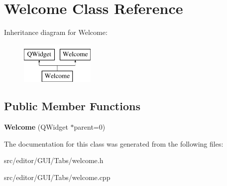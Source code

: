 \hypertarget{class_welcome}{}\section{Welcome Class Reference}
\label{class_welcome}
Inheritance diagram for Welcome\+:\begin{figure}[H]
\begin{center}
\leavevmode
\includegraphics[height=2.000000cm]{class_welcome}
\end{center}
\end{figure}
\subsection*{Public Member Functions}
\begin{DoxyCompactItemize}
\item 
\hypertarget{class_welcome_acf62624f1107ddc68761d25febbf10ad}{}\label{class_welcome_acf62624f1107ddc68761d25febbf10ad} 
{\bfseries Welcome} (Q\+Widget $\ast$parent=0)
\end{DoxyCompactItemize}


The documentation for this class was generated from the following files\+:\begin{DoxyCompactItemize}
\item 
src/editor/\+G\+U\+I/\+Tabs/welcome.\+h\item 
src/editor/\+G\+U\+I/\+Tabs/welcome.\+cpp\end{DoxyCompactItemize}
